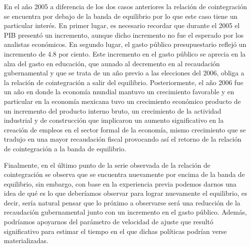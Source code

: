 En el año 2005 a diferencia de los dos casos anteriores la relación de cointegración se encuentra por debajo de la banda de equilibrio por lo que este caso tiene un particular interés. En primer lugar,  es necesario recordar que durante el 2005 el PIB presentó un incremento, aunque dicho incremento no fue el esperado por los analistas económicos. En segundo lugar, el gasto público presupuestario reflejó un incremento de 4.8 por ciento. Este incremento en el gasto público se aprecia en la alza del gasto en educación, que aunado al decremento en al recaudación gubernamental y que se trata de un año previo a las elecciones del 2006, obliga a la relación de cointegración a salir del equilibrio. Posteriormente, el año 2006 fue un año en donde la economía mundial mantuvo un crecimiento favorable y en particular en la economía mexicana tuvo un crecimiento económico producto de un incremento del producto interno bruto, un crecimiento de la actividad industrial y de construcción que implicaron un aumento significativo en la creación de empleos en el sector formal de la economía, mismo crecimiento que se tradujo en una mayor recaudación fiscal provocando así el retorno de la relación de cointegración a la banda de equilibrio.\bigskip


Finalmente, en el último punto de la serie observada de la relación de cointegración se observa que se encuentra nuevamente por encima de la banda de equilibrio, sin embargo, con base en la experiencia previa podemos darnos una idea de qué es lo que deberíamos observar para lograr nuevamente el equilibrio, es decir, sería natural pensar que lo próximo a observarse será una reducción de la recaudación gubernamental junto con un incremento en el gasto público. Además, podríamos apoyarnos del parámetro de velocidad de ajuste que resultó significativo para estimar el tiempo en el que dichas políticas podrían verse materializadas. \bigskip








